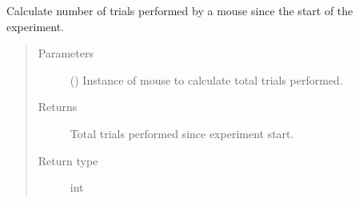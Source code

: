 \documentclass[letterpaper,10pt,english]{sphinxmanual}
\begin{document}
\begin{fulllineitems}
\label{\detokenize{NoSeMazeController/Analysis:Analysis.Analysis.n_trials_performed}}
\pysigstartsignatures
{}
\pysigstopsignatures
\sphinxAtStartPar
Calculate number of trials performed by a mouse since the start of the
experiment.
\begin{quote}\begin{description}
\item[{Parameters}] \leavevmode
\sphinxAtStartPar
{} () \textendash{} Instance of mouse to calculate total trials performed.

\item[{Returns}] \leavevmode
\sphinxAtStartPar
{} \textendash{} Total trials performed since experiment start.

\item[{Return type}] \leavevmode
\sphinxAtStartPar
int

\end{description}\end{quote}

\end{fulllineitems}

\end{document}
